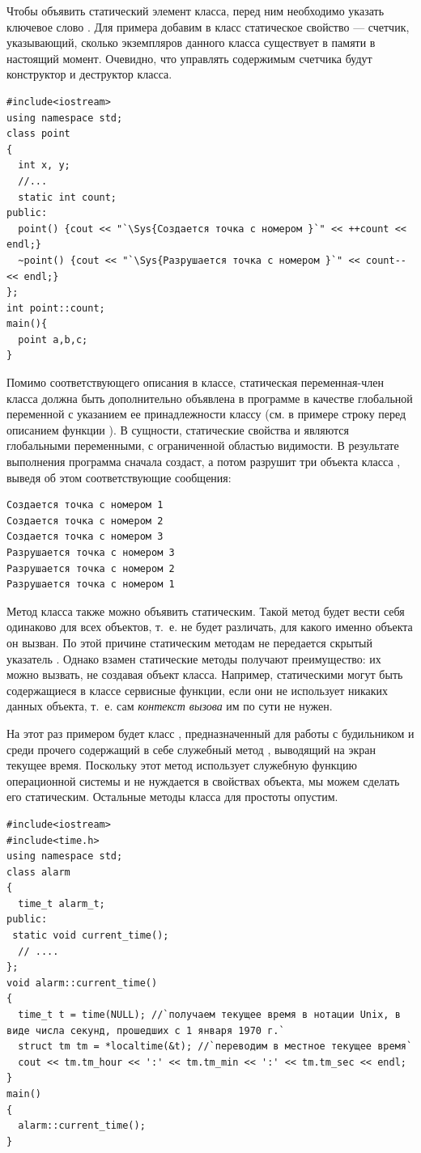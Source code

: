Чтобы объявить статический элемент класса, перед ним необходимо указать ключевое слово . Для
примера добавим в класс  статическое свойство  --- счетчик,
указывающий, сколько экземпляров данного класса существует в памяти в настоящий момент. Очевидно, что управлять
содержимым счетчика будут конструктор и деструктор класса.
\begin{lstlisting}
#include<iostream>
using namespace std;
class point 
{
  int x, y;
  //...
  static int count;
public:
  point() {cout << "`\Sys{Создается точка с номером }`" << ++count << endl;}
  ~point() {cout << "`\Sys{Разрушается точка с номером }`" << count-- << endl;}
};
int point::count;
main(){
  point a,b,c;
}
\end{lstlisting}

Помимо соответствующего описания в классе, статическая переменная-член класса должна быть дополнительно объявлена в
программе в качестве глобальной переменной с указанием ее принадлежности классу (см. в примере строку перед описанием
функции ). В сущности, статические свойства и являются глобальными переменными, с
ограниченной областью видимости. В результате выполнения программа сначала создаст, а потом разрушит три объекта класса
, выведя об этом соответствующие сообщения:
\begin{verbatim}
Создается точка с номером 1 
Создается точка с номером 2 
Создается точка с номером 3 
Разрушается точка с номером 3 
Разрушается точка с номером 2 
Разрушается точка с номером 1
\end{verbatim}

Метод класса также можно объявить статическим. Такой метод будет вести себя одинаково для всех объектов, т.~е. не будет
различать, для какого именно объекта он вызван. По этой причине статическим  методам не передается скрытый указатель
. Однако взамен статические методы получают преимущество: их можно вызвать, не создавая
объект класса. Например, статическими могут быть содержащиеся в классе сервисные функции, если они не использует
никаких данных объекта, т.~е. сам \emph{контекст вызова} им по сути не нужен. 

На этот раз примером будет класс , предназначенный для работы с  будильником и среди прочего
содержащий в себе служебный метод , выводящий на экран текущее время. Поскольку
этот метод использует служебную функцию операционной системы и не нуждается в свойствах объекта, мы можем сделать его
статическим. Остальные методы класса для простоты опустим.
\begin{lstlisting}
#include<iostream>
#include<time.h>
using namespace std;
class alarm 
{
  time_t alarm_t;
public:
 static void current_time();
  // ....
};
void alarm::current_time() 
{
  time_t t = time(NULL); //`получаем текущее время в нотации Unix, в виде числа секунд, прошедших с 1 января 1970 г.`
  struct tm tm = *localtime(&t); //`переводим в местное текущее время`
  cout << tm.tm_hour << ':' << tm.tm_min << ':' << tm.tm_sec << endl;
}
main() 
{
  alarm::current_time();
}
\end{lstlisting}

